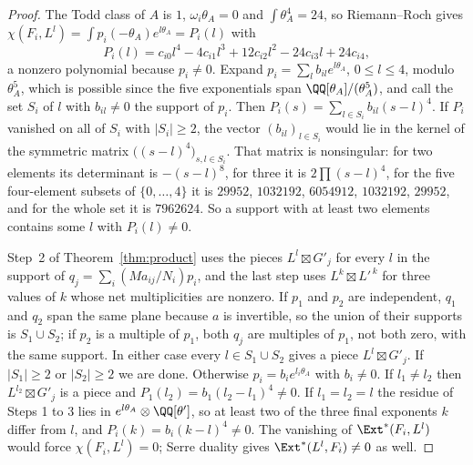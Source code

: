 \begin{proof}
The Todd class of $A$ is $1$, $\omega_{i}\theta_{A}=0$ and $\int\theta_{A}^{4}=24$, so Riemann--Roch gives $\chi(F_{i},L^{l})=\int p_{i}(-\theta_{A})e^{l\theta_{A}}=P_{i}(l)$ with
\begin{equation}\label{eq:rrpoly}
P_{i}(l)=c_{i0}l^{4}-4c_{i1}l^{3}+12c_{i2}l^{2}-24c_{i3}l+24c_{i4},
\end{equation}
a nonzero polynomial because $p_{i}\ne0$. Expand $p_{i}=\sum_{l}b_{il}e^{l\theta_{A}}$, $0\le l\le4$, modulo $\theta_{A}^{5}$, which is possible since the five exponentials span $\QQ[\theta_{A}]/(\theta_{A}^{5})$, and call the set $S_{i}$ of $l$ with $b_{il}\ne0$ the support of $p_{i}$. Then $P_{i}(s)=\sum_{l\in S_{i}}b_{il}(s-l)^{4}$. If $P_{i}$ vanished on all of $S_{i}$ with $|S_{i}|\ge2$, the vector $(b_{il})_{l\in S_{i}}$ would lie in the kernel of the symmetric matrix $\bigl((s-l)^{4}\bigr)_{s,l\in S_{i}}$. That matrix is nonsingular: for two elements its determinant is $-(s-l)^{8}$, for three it is $2\prod(s-l)^{4}$, for the five four-element subsets of $\{0,\dots,4\}$ it is $29952$, $1032192$, $6054912$, $1032192$, $29952$, and for the whole set it is $7962624$. So a support with at least two elements contains some $l$ with $P_{i}(l)\ne0$.

Step~2 of Theorem~\ref{thm:product} uses the pieces $L^{l}\boxtimes G'_{j}$ for every $l$ in the support of $q_{j}=\sum_{i}(Ma_{ij}/N_{i})p_{i}$, and the last step uses $L^{k}\boxtimes L'^{\,k}$ for three values of $k$ whose net multiplicities are nonzero. If $p_{1}$ and $p_{2}$ are independent, $q_{1}$ and $q_{2}$ span the same plane because $a$ is invertible, so the union of their supports is $S_{1}\cup S_{2}$; if $p_{2}$ is a multiple of $p_{1}$, both $q_{j}$ are multiples of $p_{1}$, not both zero, with the same support. In either case every $l\in S_{1}\cup S_{2}$ gives a piece $L^{l}\boxtimes G'_{j}$. If $|S_{1}|\ge2$ or $|S_{2}|\ge2$ we are done. Otherwise $p_{i}=b_{i}e^{l_{i}\theta_{A}}$ with $b_{i}\ne0$. If $l_{1}\ne l_{2}$ then $L^{l_{2}}\boxtimes G'_{j}$ is a piece and $P_{1}(l_{2})=b_{1}(l_{2}-l_{1})^{4}\ne0$. If $l_{1}=l_{2}=l$ the residue of Steps 1 to 3 lies in $e^{l\theta_{A}}\otimes\QQ[\theta']$, so at least two of the three final exponents $k$ differ from $l$, and $P_{i}(k)=b_{i}(k-l)^{4}\ne0$. The vanishing of $\Ext^{*}(F_{i},L^{l})$ would force $\chi(F_{i},L^{l})=0$; Serre duality gives $\Ext^{*}(L^{l},F_{i})\ne0$ as well.
\end{proof}

